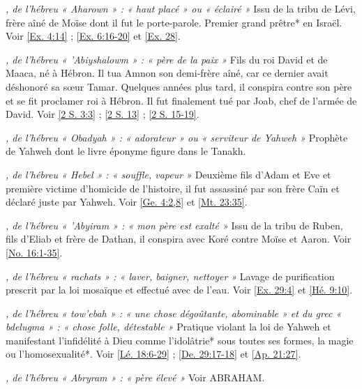 \begin{multicols}{2}

\textit{, de l'hébreu « Aharown » : « haut placé » ou « éclairé »}\newline
Issu de la tribu de Lévi, frère aîné de Moïse dont il fut le porte-parole. Premier grand prêtre* en Israël. Voir \vref{Ex. 4:14} ; \vref{Ex. 6:16-20} et \vref{Ex. 28}.

\textit{, de l'hébreu « 'Abiyshalowm » : « père de la paix »}\newline
Fils du roi David et de Maaca, né à Hébron. Il tua Amnon son demi-frère aîné, car ce dernier avait déshonoré sa sœur Tamar. Quelques années plus tard, il conspira contre son père et se fit proclamer roi à Hébron. Il fut finalement tué par Joab, chef de l'armée de David. Voir \vref{2 S. 3:3} ; \vref{2 S. 13} ; \vref{2 S. 15-19}.

\textit{, de l'hébreu « Obadyah » : « adorateur » ou « serviteur de Yahweh »}\newline
Prophète de Yahweh dont le livre éponyme figure dans le Tanakh.

\textit{, de l'hébreu « Hebel » : « souffle, vapeur »}\newline
Deuxième fils d'Adam et Eve et première victime d'homicide de l'histoire, il fut assassiné par son frère Caïn et déclaré juste par Yahweh. Voir \vref{Ge. 4:2,8} et \vref{Mt. 23:35}.

\textit{, de l'hébreu « 'Abyiram » : « mon père est exalté »}\newline
Issu de la tribu de Ruben, fils d'Eliab et frère de Dathan, il conspira avec Koré contre Moïse et Aaron. Voir \vref{No. 16:1-35}.

\textit{, de l'hébreu « rachats » : « laver, baigner, nettoyer »}\newline
Lavage de purification prescrit par la loi mosaïque et effectué avec de l'eau. Voir \vref{Ex. 29:4} et \vref{Hé. 9:10}.

\textit{, de l'hébreu « tow'ebah » : « une chose dégoûtante, abominable » et du grec « bdelugma » : « chose folle, détestable »}\newline
Pratique violant la loi de Yahweh et manifestant l'infidélité à Dieu comme l'idolâtrie* sous toutes ses formes, la magie ou l'homosexualité*. Voir \vref{Lé. 18:6-29} ; \vref{De. 29:17-18} et \vref{Ap. 21:27}.

\textit{, de l'hébreu « Abryram » : « père élevé »}\newline
Voir ABRAHAM.


\end{multicols}
